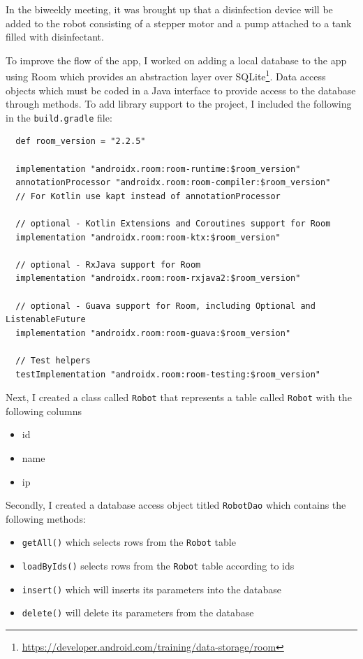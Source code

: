 \documentclass[fontsize=11pt, %
                             paper=a4, %
                             twoside, %
                             captions=tableheading,
                             index=totoc,
                             hyperref]{labbook}
\begin{document}
\begin{addmargin}[0cm]{0cm}
In the biweekly meeting, it was brought up that a disinfection device will be added to the robot consisting of a stepper motor and a pump attached to a tank filled with disinfectant.

To improve the flow of the app, I worked on adding a local database to the app using Room which provides an abstraction layer over SQLite\footnote{\url{https://developer.android.com/training/data-storage/room}}. Data access objects which must be coded in a Java interface to provide access to the database through methods. To add library support to the project, I included the following in the \texttt{build.gradle} file:
\begin{Verbatim}
  def room_version = "2.2.5"

  implementation "androidx.room:room-runtime:$room_version"
  annotationProcessor "androidx.room:room-compiler:$room_version" 
  // For Kotlin use kapt instead of annotationProcessor

  // optional - Kotlin Extensions and Coroutines support for Room
  implementation "androidx.room:room-ktx:$room_version"

  // optional - RxJava support for Room
  implementation "androidx.room:room-rxjava2:$room_version"

  // optional - Guava support for Room, including Optional and ListenableFuture
  implementation "androidx.room:room-guava:$room_version"

  // Test helpers
  testImplementation "androidx.room:room-testing:$room_version"
\end{Verbatim}
Next, I created a class called \texttt{Robot} that represents a table called \texttt{Robot} with the following columns
\begin{itemize}
\item id
\item name
\item ip
\end{itemize}
Secondly, I created a database access object titled \texttt{RobotDao} which contains the following methods:
\begin{itemize}
\item \texttt{getAll()} which selects rows from the \texttt{Robot} table
\item \texttt{loadByIds()} selects rows from the \texttt{Robot} table according to ids
\item \texttt{insert()} which will inserts its parameters into the database
\item \texttt{delete()} will delete its parameters from the database
\end{itemize}


\end{addmargin}
\end{document}
